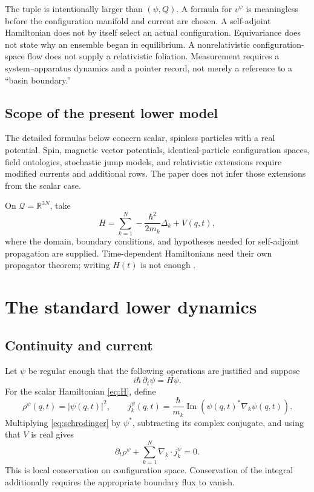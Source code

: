 \documentclass[11pt]{article}
\theoremstyle{definition}
\theoremstyle{remark}
\newcommand{\cQ}{\mathcal Q}
\begin{document}
The tuple is intentionally larger than \((\psi,Q)\).  A formula for
\(v^\psi\) is meaningless before the configuration manifold and current are
chosen.  A self-adjoint Hamiltonian does not by itself select an actual
configuration.  Equivariance does not state why an ensemble began in
equilibrium.  A nonrelativistic configuration-space flow does not supply a
relativistic foliation.  Measurement requires a system--apparatus dynamics
and a pointer record, not merely a reference to a ``basin boundary.''

\subsection{Scope of the present lower model}

The detailed formulas below concern scalar, spinless particles with a real
potential.  Spin, magnetic vector potentials, identical-particle
configuration spaces, field ontologies, stochastic jump models, and
relativistic extensions require modified currents and additional rows.  The
paper does not infer those extensions from the scalar case.

On \(\cQ=\mathbb R^{3N}\), take
\begin{equation}
H
=
\sum_{k=1}^{N}
-\frac{\hbar^2}{2m_k}\Delta_k
+V(q,t),
\label{eq:H}
\end{equation}
where the domain, boundary conditions, and hypotheses needed for
self-adjoint propagation are supplied.  Time-dependent Hamiltonians need
their own propagator theorem; writing \(H(t)\) is not enough
\cite{ReedSimon1972}.

\section{The standard lower dynamics}
\label{sec:lower}

\subsection{Continuity and current}

Let \(\psi\) be regular enough that the following operations are justified
and suppose
\begin{equation}
i\hbar\,\partial_t\psi=H\psi.
\label{eq:schrodinger}
\end{equation}
For the scalar Hamiltonian \cref{eq:H}, define
\begin{equation}
\rho^\psi(q,t)=|\psi(q,t)|^2,
\qquad
j_k^\psi(q,t)
=
\frac{\hbar}{m_k}
\operatorname{Im}\!\left(
\psi(q,t)^*\nabla_k\psi(q,t)
\right).
\label{eq:current}
\end{equation}
Multiplying \cref{eq:schrodinger} by \(\psi^*\), subtracting its complex
conjugate, and using that \(V\) is real gives
\begin{equation}
\partial_t\rho^\psi
+\sum_{k=1}^{N}\nabla_k\!\cdot j_k^\psi=0.
\label{eq:continuity}
\end{equation}
This is local conservation on configuration space.  Conservation of the
integral additionally requires the appropriate boundary flux to vanish.
\end{document}
